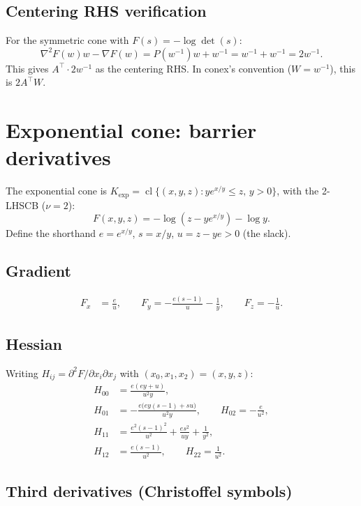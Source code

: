\documentclass[11pt]{article}
\begin{document}
\subsection*{Centering RHS verification}

For the symmetric cone with $F(s) = -\log\det(s)$:
\[
  \nabla^2 F(w) w - \nabla F(w) = P(w^{-1}) w + w^{-1} = w^{-1} + w^{-1} = 2w^{-1}.
\]
This gives $A^\top \cdot 2w^{-1}$ as the centering RHS.  In conex's convention
($W = w^{-1}$), this is $2A^\top W$. \checkmark

\section{Exponential cone: barrier derivatives}

The exponential cone is
$K_{\exp} = \operatorname{cl}\{(x,y,z) : y e^{x/y} \leq z,\, y > 0\}$,
with the 2-LHSCB ($\nu = 2$):
\[
  F(x,y,z) = -\log(z - y e^{x/y}) - \log y.
\]
Define the shorthand $e = e^{x/y}$, $s = x/y$, $u = z - ye > 0$ (the slack).

\subsection{Gradient}
\begin{align}
  F_x &= \frac{e}{u}, \qquad
  F_y = -\frac{e(s-1)}{u} - \frac{1}{y}, \qquad
  F_z = -\frac{1}{u}.
\end{align}

\subsection{Hessian}
Writing $H_{ij} = \partial^2 F / \partial x_i \partial x_j$ with
$(x_0, x_1, x_2) = (x, y, z)$:
\begin{align}
  H_{00} &= \frac{e(ey + u)}{u^2 y}, \\
  H_{01} &= -\frac{e\bigl(ey(s{-}1) + su\bigr)}{u^2 y}, \qquad
  H_{02} = -\frac{e}{u^2}, \\
  H_{11} &= \frac{e^2(s{-}1)^2}{u^2} + \frac{es^2}{uy} + \frac{1}{y^2}, \\
  H_{12} &= \frac{e(s{-}1)}{u^2}, \qquad
  H_{22} = \frac{1}{u^2}.
\end{align}

\subsection{Third derivatives (Christoffel symbols)}
\label{sec:christoffel}
\end{document}
